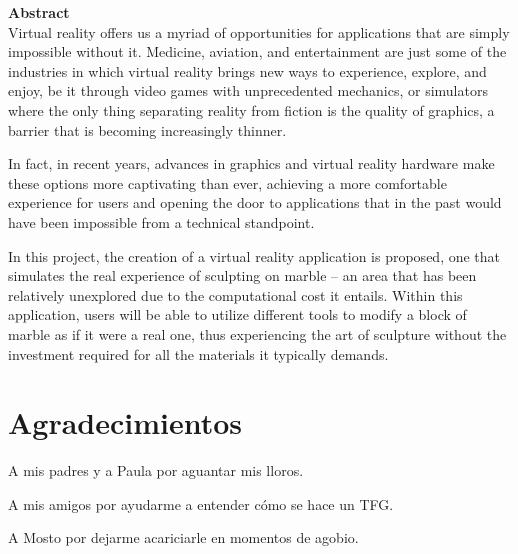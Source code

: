\noindent\textbf{Abstract}\\
Virtual reality offers us a myriad of opportunities for applications that are simply impossible without it. Medicine, aviation, and entertainment are just some of the industries in which virtual reality brings new ways to experience, explore, and enjoy, be it through video games with unprecedented mechanics, or simulators where the only thing separating reality from fiction is the quality of graphics, a barrier that is becoming increasingly thinner.

In fact, in recent years, advances in graphics and virtual reality hardware make these options more captivating than ever, achieving a more comfortable experience for users and opening the door to applications that in the past would have been impossible from a technical standpoint.

In this project, the creation of a virtual reality application is proposed, one that simulates the real experience of sculpting on marble – an area that has been relatively unexplored due to the computational cost it entails. Within this application, users will be able to utilize different tools to modify a block of marble as if it were a real one, thus experiencing the art of sculpture without the investment required for all the materials it typically demands.

\chapter*{Agradecimientos}

A mis padres y a Paula por aguantar mis lloros.

A mis amigos por ayudarme a entender cómo se hace un TFG.

A Mosto por dejarme acariciarle en momentos de agobio.





